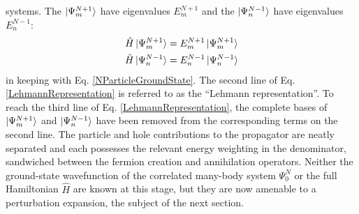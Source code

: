 systems. The $\ket{\Psi^{N+1}_{m}}$ have eigenvalues $E^{N+1}_{m}$ and the
$\ket{\Psi^{N-1}_{n}}$ have 
eigenvalues $E^{N-1}_{n}$:
\begin{equation}
    \begin{split}
        \hat{H}\ket{\Psi^{N+1}_{m}} & = E^{N+1}_{m}\ket{\Psi^{N+1}_{m}}\\
        \hat{H}\ket{\Psi^{N-1}_{n}} & = E^{N-1}_{n}\ket{\Psi^{N-1}_{n}}
    \end{split}
\end{equation}
in keeping with Eq. \ref{NParticleGroundState}. The second line
of Eq. \ref{LehmannRepresentation} is referred to as the ``Lehmann representation''.
To reach the third line of Eq. \ref{LehmannRepresentation}, the complete bases of
$\ket{\Psi^{N+1}_{m}}$ and $\ket{\Psi^{N-1}_{n}}$ have been removed from the
corresponding terms on the second line.
The particle and hole contributions to the propagator are neatly separated and
each possesses the relevant energy weighting in the denominator, sandwiched between the fermion 
creation and annihilation operators. Neither the ground-state wavefunction of the correlated
many-body system $\Psi^{N}_{0}$ or the full Hamiltonian $\hat{H}$ are known at this stage, but they
are now amenable to a perturbation expansion, the subject of the next section.

